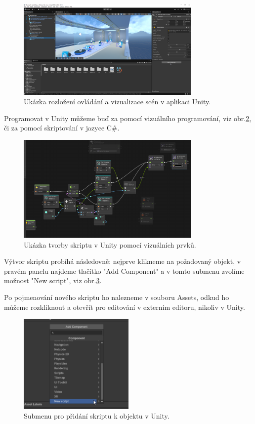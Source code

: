\documentclass[a4paper,oneside,12pt]{book}
\begin{document}
\begin{figure}[H]
	\centering
	\includegraphics[width=0.8\textwidth]{obrazky/unity_hlavni.png}
	\caption{Ukázka rozložení ovládání a vizualizace scén v aplikaci Unity.}
	\label{fig:unity_hlavni_okno}
\end{figure}

Programovat v Unity můžeme buď za pomocí vizuálního programování, viz obr.\ref{fig:unity_vizualni}, či za pomocí skriptování v jazyce C\#.

\begin{figure}[H]
	\centering
	\includegraphics[width=0.8\textwidth]{obrazky/unity_vizualni_programovani.png}
	\caption{Ukázka tvorby skriptu v Unity pomocí vizuálních prvků.}
	\label{fig:unity_vizualni}
\end{figure}
Výtvor skriptu probíhá následovně: nejprve klikneme na požadovaný objekt, v pravém panelu najdeme tlačítko "Add Component" a v tomto submenu zvolíme možnost "New script", viz obr.\ref{fig:unity_novy_skript}.

Po pojmenování nového skriptu ho nalezneme v souboru Assets, odkud ho můžeme rozkliknout a otevřít pro editování v externím editoru, nikoliv v Unity. 

\begin{figure}[H]
	\centering
	\includegraphics[width=0.5\textwidth]{obrazky/unity_pridani_skript.png}
	\caption{Submenu pro přidání skriptu k objektu v Unity.}
	\label{fig:unity_novy_skript}
\end{figure}
\end{document}
